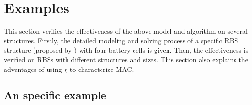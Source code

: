 \documentclass{article}
\begin{document}
\section{Examples}

This section verifies the effectiveness of the above model and algorithm on several structures.
Firstly, the detailed modeling and solving process of a specific RBS structure (proposed by \cite{visairoReconfigurableBatteryPack2008}) with four battery cells is given.
Then, the effectiveness is verified on RBSs with different structures and sizes.
This section also explains the advantages of using $\eta$ to characterize MAC.

\subsection{An specific example}
\end{document}
